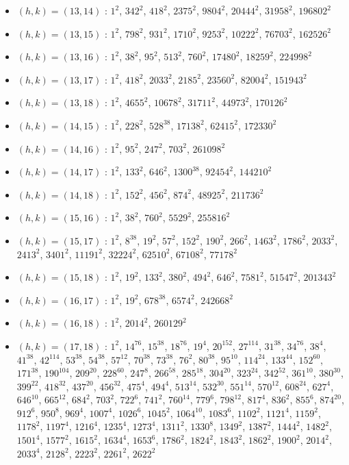 \begin{itemize}
\item $(h,k)=(13,14)$ : $1^{2}$, $342^{2}$, $418^{2}$, $2375^{2}$, $9804^{2}$, $20444^{2}$, $31958^{2}$, $196802^{2}$
\item $(h,k)=(13,15)$ : $1^{2}$, $798^{2}$, $931^{2}$, $1710^{2}$, $9253^{2}$, $10222^{2}$, $76703^{2}$, $162526^{2}$
\item $(h,k)=(13,16)$ : $1^{2}$, $38^{2}$, $95^{2}$, $513^{2}$, $760^{2}$, $17480^{2}$, $18259^{2}$, $224998^{2}$
\item $(h,k)=(13,17)$ : $1^{2}$, $418^{2}$, $2033^{2}$, $2185^{2}$, $23560^{2}$, $82004^{2}$, $151943^{2}$
\item $(h,k)=(13,18)$ : $1^{2}$, $4655^{2}$, $10678^{2}$, $31711^{2}$, $44973^{2}$, $170126^{2}$
\item $(h,k)=(14,15)$ : $1^{2}$, $228^{2}$, $528^{38}$, $17138^{2}$, $62415^{2}$, $172330^{2}$
\item $(h,k)=(14,16)$ : $1^{2}$, $95^{2}$, $247^{2}$, $703^{2}$, $261098^{2}$
\item $(h,k)=(14,17)$ : $1^{2}$, $133^{2}$, $646^{2}$, $1300^{38}$, $92454^{2}$, $144210^{2}$
\item $(h,k)=(14,18)$ : $1^{2}$, $152^{2}$, $456^{2}$, $874^{2}$, $48925^{2}$, $211736^{2}$
\item $(h,k)=(15,16)$ : $1^{2}$, $38^{2}$, $760^{2}$, $5529^{2}$, $255816^{2}$
\item $(h,k)=(15,17)$ : $1^{2}$, $8^{38}$, $19^{2}$, $57^{2}$, $152^{2}$, $190^{2}$, $266^{2}$, $1463^{2}$, $1786^{2}$, $2033^{2}$, $2413^{2}$, $3401^{2}$, $11191^{2}$, $32224^{2}$, $62510^{2}$, $67108^{2}$, $77178^{2}$
\item $(h,k)=(15,18)$ : $1^{2}$, $19^{2}$, $133^{2}$, $380^{2}$, $494^{2}$, $646^{2}$, $7581^{2}$, $51547^{2}$, $201343^{2}$
\item $(h,k)=(16,17)$ : $1^{2}$, $19^{2}$, $678^{38}$, $6574^{2}$, $242668^{2}$
\item $(h,k)=(16,18)$ : $1^{2}$, $2014^{2}$, $260129^{2}$
\item $(h,k)=(17,18)$ : $1^{2}$, $14^{76}$, $15^{38}$, $18^{76}$, $19^{4}$, $20^{152}$, $27^{114}$, $31^{38}$, $34^{76}$, $38^{4}$, $41^{38}$, $42^{114}$, $53^{38}$, $54^{38}$, $57^{12}$, $70^{38}$, $73^{38}$, $76^{2}$, $80^{38}$, $95^{10}$, $114^{24}$, $133^{44}$, $152^{60}$, $171^{38}$, $190^{104}$, $209^{20}$, $228^{60}$, $247^{8}$, $266^{58}$, $285^{18}$, $304^{20}$, $323^{24}$, $342^{52}$, $361^{10}$, $380^{30}$, $399^{22}$, $418^{32}$, $437^{20}$, $456^{32}$, $475^{4}$, $494^{4}$, $513^{14}$, $532^{30}$, $551^{14}$, $570^{12}$, $608^{24}$, $627^{4}$, $646^{10}$, $665^{12}$, $684^{2}$, $703^{2}$, $722^{6}$, $741^{2}$, $760^{14}$, $779^{6}$, $798^{12}$, $817^{4}$, $836^{2}$, $855^{6}$, $874^{20}$, $912^{6}$, $950^{8}$, $969^{4}$, $1007^{4}$, $1026^{6}$, $1045^{2}$, $1064^{10}$, $1083^{6}$, $1102^{2}$, $1121^{4}$, $1159^{2}$, $1178^{2}$, $1197^{4}$, $1216^{4}$, $1235^{4}$, $1273^{4}$, $1311^{2}$, $1330^{8}$, $1349^{2}$, $1387^{2}$, $1444^{2}$, $1482^{2}$, $1501^{4}$, $1577^{2}$, $1615^{2}$, $1634^{4}$, $1653^{6}$, $1786^{2}$, $1824^{2}$, $1843^{2}$, $1862^{2}$, $1900^{2}$, $2014^{2}$, $2033^{4}$, $2128^{2}$, $2223^{2}$, $2261^{2}$, $2622^{2}$
\end{itemize}
